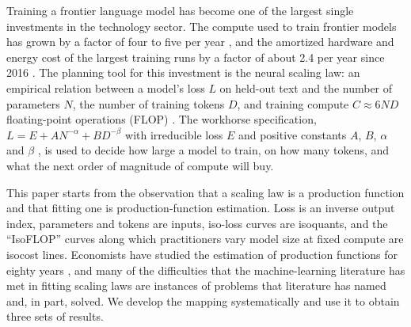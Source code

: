 
Training a frontier language model has become one of the largest single investments in the technology sector.
The compute used to train frontier models has grown by a factor of four to five per year
\citep{sevilla2024training}, and the amortized hardware and energy cost of the largest training runs by a factor
of about 2.4 per year since 2016 \citep{cottier2024rising}. The planning tool for this investment is the neural
scaling law: an empirical relation between a model's loss $L$ on held-out text and the number of parameters $N$,
the number of training tokens $D$, and training compute $C \approx 6ND$ floating-point operations (FLOP)
\citep{hestness2017deep, kaplan2020scaling, hoffmann2022training}. The workhorse specification,
$L = E + AN^{-\alpha} + BD^{-\beta}$ with irreducible loss $E$ and positive constants $A$, $B$, $\alpha$ and
$\beta$ \citep{hoffmann2022training}, is used to decide how large a model to train, on how many tokens, and what
the next order of magnitude of compute will buy.

This paper starts from the observation that a scaling law is a production function and that fitting one is
production-function estimation. Loss is an inverse output index, parameters and tokens are inputs, iso-loss curves
are isoquants, and the ``IsoFLOP'' curves along which practitioners vary model size at fixed compute are isocost
lines. Economists have studied the estimation of production functions for eighty years
\citep{marschak1944random, griliches1998production, ackerberg2007econometric}, and many of the difficulties that
the machine-learning literature has met in fitting scaling laws are instances of problems that literature has named
and, in part, solved. We develop the mapping systematically and use it to obtain three sets of results.

